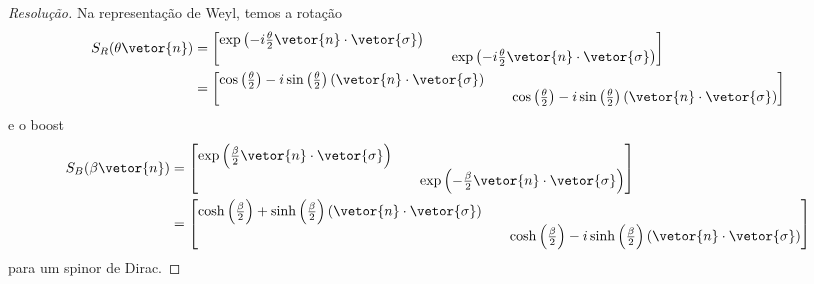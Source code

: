 \begin{proof}[Resolução]
    Na representação de Weyl, temos a rotação 
    \begin{align*}
        S_R(\theta\vetor{n}) 
        &= \begin{bmatrix}
            \exp\left(-i\frac{\theta}{2}\vetor{n}\cdot\vetor{\sigma}\right) && \\
                                                                            &&\exp\left(-i\frac{\theta}{2}\vetor{n}\cdot\vetor{\sigma}\right)
        \end{bmatrix}\\
        &= \begin{bmatrix}
            \cos\left(\frac\theta2\right) - i \sin\left(\frac\theta2\right) (\vetor{n}\cdot\vetor{\sigma})&&\\
                                                                                                                      &&\cos\left(\frac\theta2\right) - i \sin\left(\frac\theta2\right) (\vetor{n}\cdot\vetor{\sigma})
        \end{bmatrix}
    \end{align*}
    e o boost
    \begin{align*}
        S_B(\beta\vetor{n})
        &= \begin{bmatrix}
            \exp\left(\frac{\beta}{2}\vetor{n}\cdot\vetor{\sigma}\right) && \\
                                                                            &&\exp\left(-\frac{\beta}{2}\vetor{n}\cdot\vetor{\sigma}\right)
        \end{bmatrix}\\
        &= \begin{bmatrix}
            \cosh\left(\frac\beta2\right) +\sinh\left(\frac\beta2\right) (\vetor{n}\cdot\vetor{\sigma})&&\\
                                                                                                                      &&\cosh\left(\frac\beta2\right) - i \sinh\left(\frac\beta2\right) (\vetor{n}\cdot\vetor{\sigma})
        \end{bmatrix}
    \end{align*}
    para um spinor de Dirac.
\end{proof}
